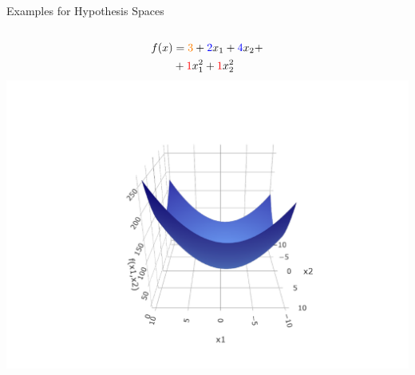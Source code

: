 \documentclass[11pt,compress,t,notes=noshow, xcolor=table]{beamer}
\begin{document}
\begin{vbframe}{Examples for Hypothesis Spaces}
\begin{columns}
  \begin{column}{0.33\textwidth}
    \begin{center}
      \begin{equation*}
        \begin{split}
          f(x) &= \textcolor{orange}{3} + \textcolor{blue}{2} x_1 + 
          \textcolor{blue}{4} x_2 + \\
          &+ \textcolor{red}{1} x_1^2 + \textcolor{red}{1} x_2^2
        \end{split}
      \end{equation*}
      \includegraphics[width=1.2\textwidth]{figure/hs-quadric-2.pdf}
    \end{center}
  \end{column}
  

\end{columns}
\end{vbframe}
\end{document}
